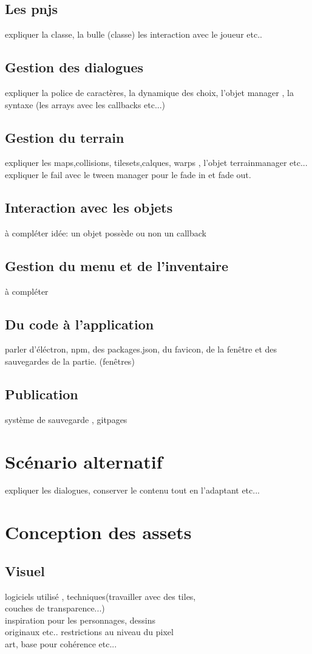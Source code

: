\documentclass[11pt]{article}
\begin{document}
\subsection{Les pnjs}
expliquer la classe, la bulle (classe) 
les interaction avec le joueur etc..
\subsection{Gestion des dialogues}
expliquer la police de caractères, la dynamique des choix, l'objet manager , la syntaxe (les arrays avec les callbacks etc...)
\subsection{Gestion du terrain}
expliquer les maps,collisions, tilesets,calques, warps , l'objet terrainmanager etc... expliquer le fail avec le tween manager pour le fade in et fade out.
\subsection{Interaction avec les objets}
à compléter idée: un objet possède ou non un callback 
\subsection{Gestion du menu et de l'inventaire}
à compléter
\subsection{Du code à l'application}
parler d'éléctron, npm, des packages.json, du favicon, de la fenêtre et des sauvegardes de la partie. (fenêtres)

\subsection{Publication}
système de sauvegarde , gitpages
\section{Scénario alternatif}
expliquer les dialogues, conserver le contenu tout en l'adaptant etc...
\section{Conception des assets}
\subsection{Visuel}
logiciels utilisé , techniques(travailler avec des tiles, \\ couches de transparence...)\\ inspiration pour les personnages, dessins\\ originaux etc.. restrictions au niveau du pixel\\ art, base pour cohérence etc...
\end{document}
